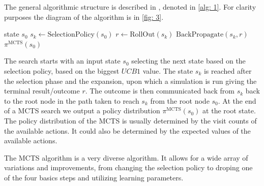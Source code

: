 The general algorithmic structure is described in \cite{mcts_survey}, denoted
in \ref{alg: 1}. For clarity purposes the diagram of the algorithm is in
\ref{fig: 3}.
\begin{algorithm}
\caption{MCTS Algorithm}\label{alg: 1}
    \begin{algorithmic}
        \Require state $s_0$
            \State $s_k \gets \text{SelectionPolicy}(s_0)$
            \State  $r \gets \text{RollOut}(s_k)$
            \State $\text{BackPropagate}(s_k, r)$
        \EndWhile
        \Ensure $\pi^{\text{MCTS}}(s_0) $
    \end{algorithmic}
\end{algorithm}
The search starts with an input state $s_0$ selecting the next state based on
the selection policy, based on the biggest $UCB1$ value. The state $s_k$ is
reached after the selection phase and the expansion, upon which a simulation
is run giving the terminal result/outcome $r$. The outcome is then
communicated back from $s_k$ back to the root node in the path taken to reach
$s_k$ from the root node $s_0$. At the end of a MCTS search we output a
policy distribution $\pi^{\text{MCTS}}(s_0)$ at the root state. The policy
distribution of the MCTS is usually determined by the visit counts of the
available actions. It could also be determined by the expected values of the
available actions.
\newline

The MCTS algorithm is a very diverse algorithm. It allows for a wide array of
variations and improvements, from changing the selection policy to droping
one of the four basics steps and utilizing learning parameters.

